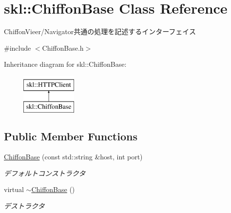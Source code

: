 \hypertarget{classskl_1_1_chiffon_base}{}\section{skl\+:\+:Chiffon\+Base Class Reference}
\label{classskl_1_1_chiffon_base}


Chiffon\+Vieer/\+Navigator共通の処理を記述するインターフェイス　  




{\ttfamily \#include $<$Chiffon\+Base.\+h$>$}

Inheritance diagram for skl\+:\+:Chiffon\+Base\+:\begin{figure}[H]
\begin{center}
\leavevmode
\includegraphics[height=2.000000cm]{classskl_1_1_chiffon_base}
\end{center}
\end{figure}
\subsection*{Public Member Functions}
\begin{DoxyCompactItemize}
\item 
\hypertarget{classskl_1_1_chiffon_base_ad52ce5895d15a9c1b16419f09e9b4d36}{}\label{classskl_1_1_chiffon_base_ad52ce5895d15a9c1b16419f09e9b4d36} 
\hyperlink{classskl_1_1_chiffon_base_ad52ce5895d15a9c1b16419f09e9b4d36}{Chiffon\+Base} (const std\+::string \&host, int port)
\begin{DoxyCompactList}\small\item\em デフォルトコンストラクタ \end{DoxyCompactList}\item 
\hypertarget{classskl_1_1_chiffon_base_ae1a4691bb4aad50ebcc3899aae8d3c00}{}\label{classskl_1_1_chiffon_base_ae1a4691bb4aad50ebcc3899aae8d3c00} 
virtual \hyperlink{classskl_1_1_chiffon_base_ae1a4691bb4aad50ebcc3899aae8d3c00}{$\sim$\+Chiffon\+Base} ()
\begin{DoxyCompactList}\small\item\em デストラクタ \end{DoxyCompactList}\end{DoxyCompactItemize}

